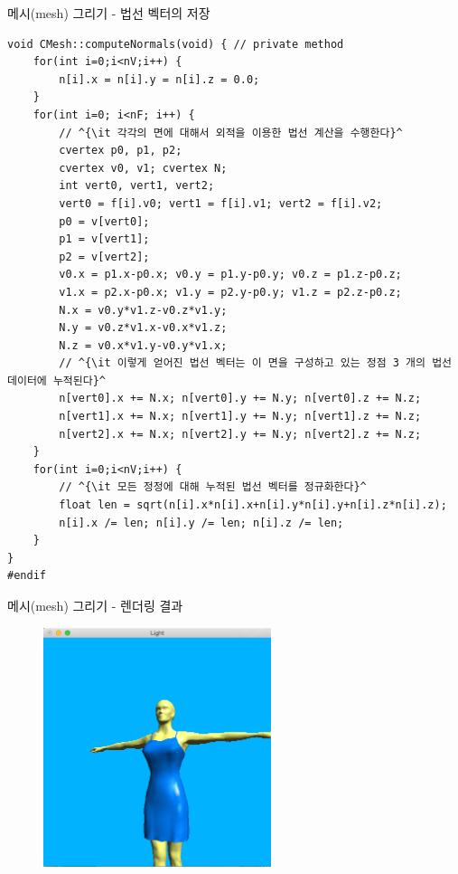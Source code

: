 \documentclass{beamer}
\begin{document}
\begin{frame}[fragile]{메시(mesh) 그리기 - 법선 벡터의 저장}

\lstset{language=C++, escapechar=^} 
\begin{lstlisting}
void CMesh::computeNormals(void) { // private method    
    for(int i=0;i<nV;i++) {
        n[i].x = n[i].y = n[i].z = 0.0;
    }    
    for(int i=0; i<nF; i++) {
        // ^{\it 각각의 면에 대해서 외적을 이용한 법선 계산을 수행한다}^
        cvertex p0, p1, p2;
        cvertex v0, v1; cvertex N;
        int vert0, vert1, vert2;
        vert0 = f[i].v0; vert1 = f[i].v1; vert2 = f[i].v2;
        p0 = v[vert0];
        p1 = v[vert1];
        p2 = v[vert2];
        v0.x = p1.x-p0.x; v0.y = p1.y-p0.y; v0.z = p1.z-p0.z;
        v1.x = p2.x-p0.x; v1.y = p2.y-p0.y; v1.z = p2.z-p0.z;        
        N.x = v0.y*v1.z-v0.z*v1.y;
        N.y = v0.z*v1.x-v0.x*v1.z;
        N.z = v0.x*v1.y-v0.y*v1.x;
        // ^{\it 이렇게 얻어진 법선 벡터는 이 면을 구성하고 있는 정점 3 개의 법선 데이터에 누적된다}^
        n[vert0].x += N.x; n[vert0].y += N.y; n[vert0].z += N.z;
        n[vert1].x += N.x; n[vert1].y += N.y; n[vert1].z += N.z;
        n[vert2].x += N.x; n[vert2].y += N.y; n[vert2].z += N.z;
    }    
    for(int i=0;i<nV;i++) {
        // ^{\it 모든 정정에 대해 누적된 법선 벡터를 정규화한다}^
        float len = sqrt(n[i].x*n[i].x+n[i].y*n[i].y+n[i].z*n[i].z);
        n[i].x /= len; n[i].y /= len; n[i].z /= len;
    }    
}
#endif
\end{lstlisting}

\end{frame}

\begin{frame}[fragile]{메시(mesh) 그리기 - 렌더링 결과}

\begin{figure}[h!]
  \centering
    \includegraphics[height=7cm]{OGL_light/meshSmoothSurfaces.png}
\end{figure}

\end{frame}
\end{document}
